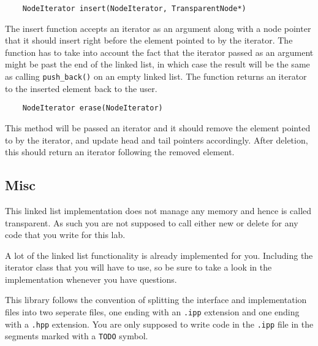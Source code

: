 \documentclass{article}
\begin{document}
\begin{lstlisting}
    NodeIterator insert(NodeIterator, TransparentNode*)
\end{lstlisting}
The insert function accepts an iterator as an argument along with a node
pointer that it should insert right before the element pointed to by the
iterator.  The function has to take into account the fact that the iterator
passed as an argument might be past the end of the linked list, in which case
the result will be the same as calling \texttt{push\_back()} on an empty
linked list.  The function returns an iterator to the inserted element back to
the user.

\begin{lstlisting}
    NodeIterator erase(NodeIterator)
\end{lstlisting}
This method will be passed an iterator and it should remove the element
pointed to by the iterator, and update head and tail pointers accordingly.
After deletion, this should return an iterator following the removed element.

\bigskip
\subsection{Misc}

This linked list implementation does not manage any memory and hence is called
transparent.  As such you are not supposed to call either new or delete for
any code that you write for this lab.

A lot of the linked list functionality is already implemented for you.
Including the iterator class that you will have to use, so be sure to take a
look in the implementation whenever you have questions.

This library follows the convention of splitting the interface and
implementation files into two seperate files, one ending with an \texttt{.ipp}
extension and one ending with a \texttt{.hpp} extension.  You are only
supposed to write code in the \texttt{.ipp} file in the segments marked with a
\texttt{TODO} symbol.
\end{document}
